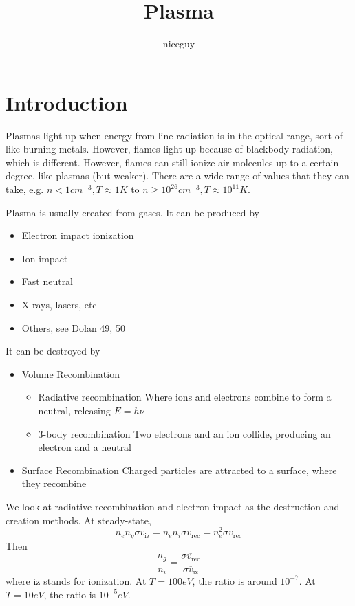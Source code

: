 \documentclass[12pt]{article}
\title{Plasma}
\author{niceguy}
\begin{document}
\maketitle

\section{Introduction}

Plasmas light up when energy from line radiation is in the optical range, sort of like burning metals. However, flames light up because of blackbody radiation, which is different. However, flames can still ionize air molecules up to a certain degree, like plasmas (but weaker). There are a wide range of values that they can take, e.g. $n < 1\unit{cm^{-3}}, T \approx 1\unit{K}$ to $n \geq 10^{26}\unit{cm^{-3}}, T \approx 10^{11}\unit{K}$.

Plasma is usually created from gases. It can be produced by

\begin{itemize}
    \item Electron impact ionization
    \item Ion impact
    \item Fast neutral
    \item X-rays, lasers, etc
    \item Others, see Dolan 49, 50
\end{itemize}

It can be destroyed by

\begin{itemize}
    \item Volume Recombination
        \begin{itemize}
            \item Radiative recombination
                Where ions and electrons combine to form a neutral, releasing $E = h\nu$
            \item 3-body recombination
                Two electrons and an ion collide, producing an electron and a neutral
        \end{itemize}
    \item Surface Recombination
        Charged particles are attracted to a surface, where they recombine
\end{itemize}
                
\begin{ex}
    We look at radiative recombination and electron impact as the destruction and creation methods. At steady-state,
    $$n_en_g \overline{\sigma v_{\text{iz}}} = n_en_i \overline{\sigma v_{\text{rec}}} = n_e^2 \overline{\sigma v_{\text{rec}}}$$
    Then
    $$\frac{n_g}{n_i} = \frac{\overline{\sigma v_{\text{rec}}}}{\overline{\sigma v_{\text{iz}}}}$$
    where iz stands for ionization.
    At $T = 100\unit{eV}$, the ratio is around $10^{-7}$. At $T = 10\unit{eV}$, the ratio is $10^{-5}\unit{eV}$.
\end{ex}
\end{document}
